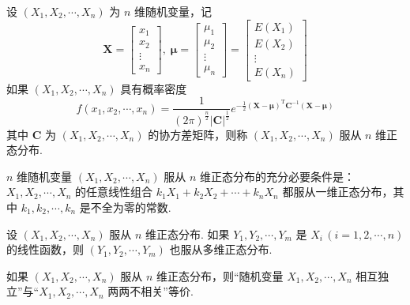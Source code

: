 设 $(X_1,X_2,\cdots,X_n)$ 为 $n$ 维随机变量，记
$$
\boldsymbol{X} = \begin{bmatrix}
    x_1 \\
    x_2 \\
    \vdots \\
    x_n
\end{bmatrix}, \;
\boldsymbol{\mu} = \begin{bmatrix}
    \mu_1 \\
    \mu_2 \\
    \vdots \\
    \mu_n
\end{bmatrix} = \begin{bmatrix}
    E(X_1) \\
    E(X_2) \\
    \vdots \\
    E(X_n)
\end{bmatrix}
$$
如果 $(X_1,X_2,\cdots,X_n)$ 具有概率密度
$$
f(x_1,x_2,\cdots,x_n) = \dfrac{1}{(2\pi)^{\frac{n}{2}} |\boldsymbol{C}|^{\frac{1}{2}}} e^{-\frac{1}{2} (\boldsymbol{X} - \boldsymbol{\mu})^{\text{T}} \boldsymbol{C}^{-1} (\boldsymbol{X} - \boldsymbol{\mu})}
$$
其中 $\boldsymbol{C}$ 为 $(X_1,X_2,\cdots,X_n)$ 的协方差矩阵，则称 $(X_1,X_2,\cdots,X_n)$ 服从 $n$ 维正态分布.

\begin{property}
    $n$ 维随机变量 $(X_1,X_2,\cdots,X_n)$ 服从 $n$ 维正态分布的充分必要条件是：\\
    $X_1,X_2,\cdots,X_n$ 的任意线性组合 $k_1 X_1 + k_2 X_2 + \cdots + k_n X_n$ 都服从一维正态分布，其中 $k_1,k_2,\cdots,k_n$ 是不全为零的常数.
\end{property}

\begin{property}
    设 $(X_1,X_2,\cdots,X_n)$ 服从 $n$ 维正态分布. 如果 $Y_1,Y_2,\cdots,Y_m$ 是 $X_i \, (i=1,2,\cdots,n)$ 的线性函数，则 $(Y_1,Y_2,\cdots,Y_m)$ 也服从多维正态分布.
\end{property}

\begin{property}
    如果 $(X_1,X_2,\cdots,X_n)$ 服从 $n$ 维正态分布，则“随机变量 $X_1,X_2,\cdots,X_n$ 相互独立”与“$X_1,X_2,\cdots,X_n$ 两两不相关”等价.
\end{property}
